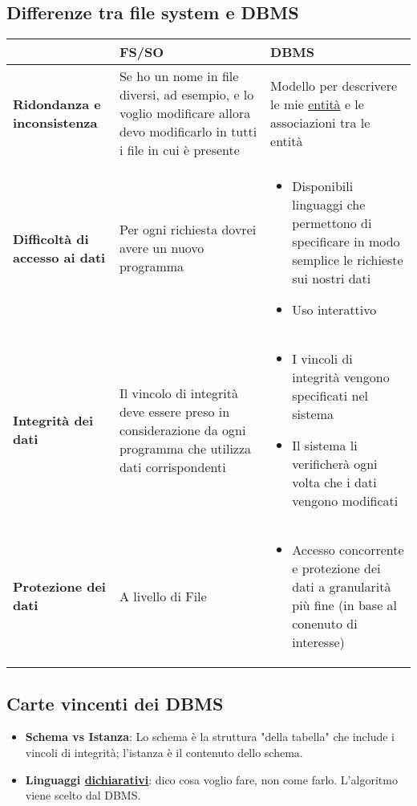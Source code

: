 \documentclass[12pt]{article}
\begin{document}
\subsection{Differenze tra file system e DBMS}
\begin{center}
    \begin{tabular}{| m{6em} | m{20em} | m{15em} |}
        \hline
         & \textbf{FS/SO} & \textbf{DBMS} \\
        \hline
        \textbf{Ridondanza e inconsistenza} & 
        Se ho un nome in file diversi, ad esempio, e lo voglio modificare allora devo modificarlo in tutti i file in cui è presente & 
        Modello per descrivere le mie \uline{entità} e le associazioni tra le entità \\
        \hline
        \textbf{Difficoltà di accesso ai dati} &
        Per ogni richiesta dovrei avere un nuovo programma &
        \begin{itemize}
            \setlength\itemsep{0em}
            \item Disponibili linguaggi che permettono di specificare in modo semplice le richieste sui nostri dati
            \item Uso interattivo
        \end{itemize}
        \\
        \hline
        \textbf{Integrità dei dati} &
        Il vincolo di integrità deve essere preso in considerazione da ogni programma che utilizza dati corrispondenti&
        \begin{itemize}
            \setlength\itemsep{0em}
            \item I vincoli di integrità vengono specificati nel sistema
            \item Il sistema li verificherà ogni volta che i dati vengono modificati
        \end{itemize} \\
        \hline
        \textbf{Protezione dei dati} &
        A livello di File&
        \begin{itemize}
            \setlength\itemsep{0em}
            \item Accesso concorrente e protezione dei dati a granularità più fine (in base al conenuto di interesse)
        \end{itemize} \\
        \hline
    \end{tabular}
\end{center}
\subsection{Carte vincenti dei DBMS}
\begin{itemize}
    \setlength\itemsep{0em}
    \item \textbf{Schema vs Istanza}: Lo schema è la struttura "della tabella" che include i vincoli di integrità; l'istanza è il contenuto dello schema.
    \item \textbf{Linguaggi \uline{dichiarativi}}: dico cosa voglio fare, non come farlo. L'algoritmo viene scelto dal DBMS.
\end{itemize}
\end{document}
